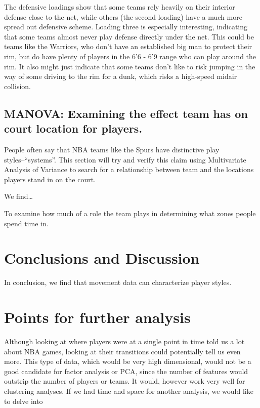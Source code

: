 \documentclass[]{article}
\begin{document}
The defensive loadings show that some teams rely heavily on their
interior defense close to the net, while others (the second loading)
have a much more spread out defensive scheme. Loading three is
especially interesting, indicating that some teams almost never play
defense directly under the net. This could be teams like the Warriors,
who don't have an established big man to protect their rim, but do have
plenty of players in the 6'6 - 6'9 range who can play around the rim. It
also might just indicate that some teams don't like to risk jumping in
the way of some driving to the rim for a dunk, which risks a high-speed
midair collision.

\subsection{MANOVA: Examining the effect team has on court location for
players.}\label{manova-examining-the-effect-team-has-on-court-location-for-players.}

People often say that NBA teams like the Spurs have distinctive play
styles--``systems''. This section will try and verify this claim using
Multivariate Analysis of Variance to search for a relationship between
team and the locations players stand in on the court.

We find\ldots{}

To examine how much of a role the team plays in determining what zones
people spend time in.

\section{Conclusions and Discussion}\label{conclusions-and-discussion}

In conclusion, we find that movement data can characterize player
styles.

\section{Points for further analysis}\label{points-for-further-analysis}

Although looking at where players were at a single point in time told us
a lot about NBA games, looking at their transitions could potentially
tell us even more. This type of data, which would be very high
dimensional, would not be a good candidate for factor analysis or PCA,
since the number of features would outstrip the number of players or
teams. It would, however work very well for clustering analyses. If we
had time and space for another analysis, we would like to delve into
\end{document}
